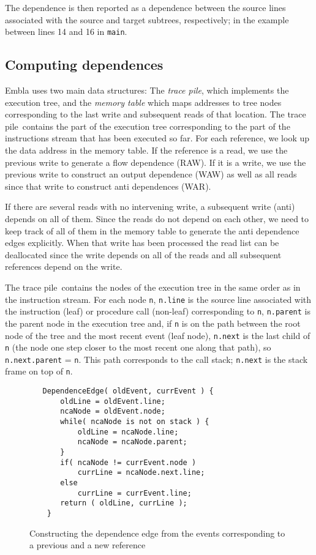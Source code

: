 \documentclass{acm_proc_article-sp}
\begin{document}
The dependence is then reported as a dependence between the source lines
associated with the source and target subtrees, respectively; in the example
between lines 14 and 16 in {\tt main}.

\newcommand{\tracepile}{trace pile}

\subsection{Computing dependences}

Embla uses two main data structures: The {\em \tracepile}, which implements 
the execution tree, and the {\em memory table} which maps addresses to tree
nodes corresponding to the last write and subsequent reads of that
location. The \tracepile\ contains the part of the execution tree
corresponding to the part of the instructions stream that has been
executed so far.
For each reference, we look up the data address in the memory 
table. If the reference is a read, we use the previous write to generate
a flow dependence (RAW). If it is a write, we use the previous write to 
construct an output dependence (WAW) as well as all reads since that 
write to construct anti dependences (WAR).

If there are several reads with no intervening write, a subsequent write
(anti) depends on all of them. Since the reads do not depend on each other,
we need to keep track of all of them in the memory table to generate the
anti dependence edges explicitly. When that write has been processed 
the read list can be deallocated since
the write depends on all of the reads and
all subsequent references depend on the write.

The \tracepile\ contains the nodes of the execution tree in the same order
as in the instruction stream. For each node {\tt n}, {\tt n.line} is the 
source line associated with the instruction (leaf) or procedure call
(non-leaf) 
corresponding to {\tt n}, {\tt n.parent} is the parent node in the execution tree 
and, if {\tt n} is 
on the path between the root node of the tree and the most recent 
event (leaf node), {\tt n.next} is the last child of {\tt n} (the node one step 
closer to the most recent one
along that path), so {\tt n.next.parent} = {\tt n}. This
path corresponds to the call stack; {\tt n.next} is the stack frame on
top of {\tt n}.

\begin{figure}
\small
\hrulefill
\begin{verbatim}
   DependenceEdge( oldEvent, currEvent ) {
       oldLine = oldEvent.line;
       ncaNode = oldEvent.node;
       while( ncaNode is not on stack ) {
           oldLine = ncaNode.line;
           ncaNode = ncaNode.parent;
       }
       if( ncaNode != currEvent.node )
           currLine = ncaNode.next.line;
       else
           currLine = currEvent.line;
       return ( oldLine, currLine );
    }
\end{verbatim}
\hrulefill
\caption{Constructing the dependence edge from the events corresponding
to a previous and a new reference}
\label{fdepedge}
\end{figure}    
\end{document}
